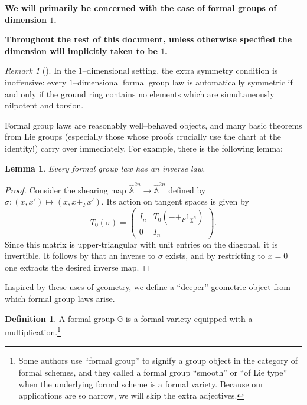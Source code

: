\documentclass{amsart}
\newcommand{\G}{\mathbb G}
\newcommand{\A}{\widehat{\mathbb{A}}}
\newcommand{\<}{\langle}
\renewcommand{\>}{\rangle}
\theoremstyle{plain}
\newtheorem*{lemma}{Lemma}
\theoremstyle{definition}
\newtheorem*{definition}{Definition}
\theoremstyle{remark}
\newtheorem*{remark}{Remark}
\begin{document}
\begin{center}
\textbf{We will primarily be concerned with the case of formal groups of dimension $1$.}

\textbf{Throughout the rest of this document, unless otherwise specified the dimension will implicitly taken to be $1$.}
\end{center}

\begin{remark}[{\cite[Theorem I]{Lazard}}]
In the $1$--dimensional setting, the extra symmetry condition is inoffensive: every $1$--dimensional formal group law is automatically symmetric if and only if the ground ring contains no elements which are simultaneously nilpotent and torsion.
\end{remark}

Formal group laws are reasonably well--behaved objects, and many basic theorems from Lie groups (especially those whose proofs crucially use the chart at the identity!) carry over immediately.  For example, there is the following lemma:

\begin{lemma}
Every formal group law has an inverse law.
\end{lemma}
\begin{proof}
Consider the shearing map $\A^{2n} \to \A^{2n}$ defined by $\sigma: (x, x') \mapsto (x, x +_F x')$.  Its action on tangent spaces is given by \[T_0 (\sigma) = \left( \begin{array}{c|c} I_n & T_0( - +_F 1_{\A^n} ) \\ \hline 0 & I_n \end{array} \right).\]  Since this matrix is upper-triangular with unit entries on the diagonal, it is invertible.  It follows by  that an inverse to $\sigma$ exists, and by restricting to $x = 0$ one extracts the desired inverse map.
\end{proof}

Inspired by these uses of geometry, we define a ``deeper'' geometric object from which formal group laws arise.
\begin{definition}
A formal group $\G$ is a formal variety equipped with a multiplication.\footnote{Some authors use ``formal group'' to signify a group object in the category of formal schemes, and they called a formal group ``smooth'' or ``of Lie type'' when the underlying formal scheme is a formal variety.  Because our applications are so narrow, we will skip the extra adjectives.}
\end{definition}
\end{document}
